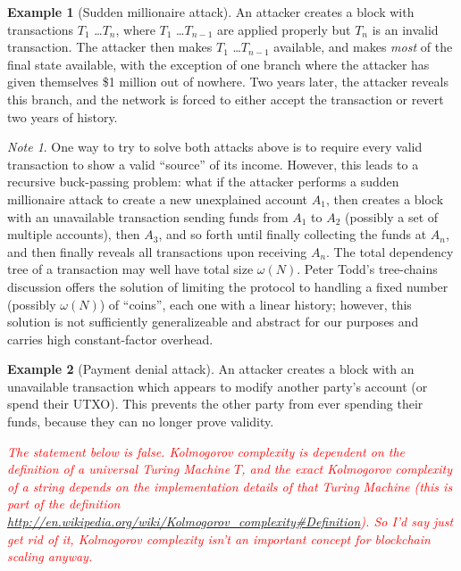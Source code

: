 \documentclass[11pt,a4paper]{report}
\newcommand{\comment}[1]{\textcolor{red}{\textit{#1}}}
\theoremstyle{plain}
\theoremstyle{definition}
\newtheorem{exmp}{Example}[section]
\theoremstyle{remark}
\newtheorem*{note}{Note}
\begin{document}
\begin{exmp}[Sudden millionaire attack]
An attacker creates a block with transactions $T_1$ \ldots $T_n$, where $T_1$ \ldots $T_{n-1}$ are applied properly but $T_n$ is an invalid transaction. The attacker then makes $T_1$ \ldots $T_{n-1}$ available, and makes \emph{most} of the final state available, with the exception of one branch where the attacker has given themselves \$1 million out of nowhere. Two years later, the attacker reveals this branch, and the network is forced to either accept the transaction or revert two years of history.
\end{exmp}

\begin{note}
One way to try to solve both attacks above is to require every valid transaction to show a valid ``source'' of its income. However, this leads to a recursive buck-passing problem: what if the attacker performs a sudden millionaire attack to create a new unexplained account $A_1$, then creates a block with an unavailable transaction sending funds from $A_1$ to $A_2$ (possibly a set of multiple accounts), then $A_3$, and so forth until finally collecting the funds at $A_n$, and then finally reveals all transactions upon receiving $A_n$. The total dependency tree of a transaction may well have total size $\omega(N)$. Peter Todd's tree-chains discussion offers the solution \citep{todd_re:_2014} of limiting the protocol to handling a fixed number (possibly $\omega(N)$) of ``coins'', each one with a linear history; however, this solution is not sufficiently generalizeable and abstract for our purposes and carries high constant-factor overhead.
\end{note}

\begin{exmp}[Payment denial attack]
An attacker creates a block with an unavailable transaction which appears to modify another party's account (or spend their UTXO). This prevents the other party from ever spending their funds, because they can no longer prove validity.
\end{exmp}

\comment{The statement below is false.  Kolmogorov complexity is dependent on the definition of a universal Turing Machine $T$, and the exact Kolmogorov complexity of a string depends on the implementation details of that Turing Machine (this is part of the definition \url{http://en.wikipedia.org/wiki/Kolmogorov_complexity\#Definition}).  So I'd say just get rid of it, Kolmogorov complexity isn't an important concept for blockchain scaling anyway.}
\end{document}
